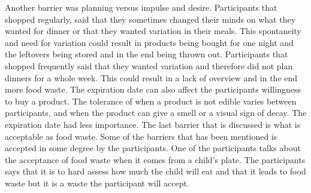 Another barrier was planning versus impulse and desire. Participants that shopped regularly, said that they sometimes changed their minds on what they wanted for dinner or that they wanted variation in their meals. This spontaneity and need for variation could result in products being bought for one night and the leftovers being stored and in the end being thrown out. Participants that shopped frequently said that they wanted variation and therefore did not plan dinners for a whole week. This could result in a lack of overview and in the end more food waste. The expiration date can also affect the participants willingness to buy a product. The tolerance of when a product is not edible varies between participants, and when the product can give a smell or a visual sign of decay. The expiration date had less importance. The last barrier that is discussed is what is acceptable as food waste. Some of the barriers that has been mentioned is accepted in some degree by the participants. One of the participants talks about the acceptance of food waste when it comes from a child's plate. The participants says that it is to hard assess how much the child will eat and that it leads to food waste but it is a waste the participant will accept.